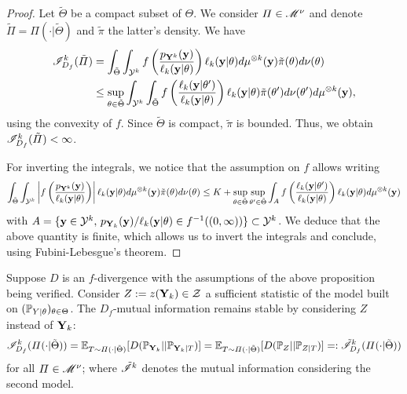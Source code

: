 \begin{proof}
    Let $\tilde\Theta$ be a compact subset of $\Theta$. We consider $\varPi\in\mathscr{M}^\nu$ and denote $\tilde\varPi=\varPi(\cdot|\tilde\Theta)$ and  $\tilde\pi$ the latter's density. We have
        \begin{equation}
        \begin{aligned}
            \mathscr{I}^k_{D_f}(\tilde\varPi) &= \int_{\tilde\Theta}\int_{\mathcal{Y}^k} f\left( \frac{p_{\mathbf{Y}^k}(\mathbf{y})}{\ell_k(\mathbf{y}|\theta)}\right)\ell_k(\mathbf{y}|\theta) d\mu^{\otimes k}(\mathbf{y}) \tilde\pi(\theta)d\nu(\theta) \\
                &\leq \sup_{\theta\in\tilde\Theta}\int_{\mathcal{Y}^k} \int_{\tilde\Theta} f\left( \frac{\ell_k(\mathbf{y}|\theta')}{\ell_k(\mathbf{y}|\theta)}\right)\ell_k(\mathbf{y}|\theta) \tilde\pi(\theta')d\nu(\theta') d\mu^{\otimes k}(\mathbf{y}) ,
        \end{aligned}
        \end{equation}
        using the convexity of $f$. Since $\tilde\Theta$ is compact, $\tilde\pi$ is bounded. Thus, we obtain $\mathscr{I}^k_{D_f}(\tilde\varPi)<\infty$.

        For inverting the integrals, we notice that the assumption on $f$ allows writing 
        \begin{equation}
            \int_{\tilde\Theta}\int_{\mathcal{Y}^k} \left|f\left( \frac{p_{\mathbf{Y}^k}(\mathbf{y})}{\ell_k(\mathbf{y}|\theta)}\right)\right|\ell_k(\mathbf{y}|\theta) d\mu^{\otimes k}(\mathbf{y}) \tilde\pi(\theta)d\nu(\theta) \leq K + \sup_{\theta\in\tilde\Theta}\sup_{\theta'\in\tilde\Theta} \int_{A} f\left(\frac{\ell_k(\mathbf{y}|\theta')}{\ell_k(\mathbf{y}|\theta)}  \right) \ell_k(\mathbf{y}|\theta) d\mu^{\otimes k}(\mathbf{y})
        \end{equation}
        with $A=\{\mathbf{y}\in\mathcal{Y}^k,\, p_{\mathbf{Y}_k}(\mathbf{y})/\ell_k(\mathbf{y}|\theta)\in f^{-1}((0,\infty)) \}\subset\mathcal{Y}^k $. We deduce that the above quantity is finite, which allows us to invert the integrals and conclude, using Fubini-Lebesgue's theorem.
\end{proof}

\begin{prop}
    Suppose $D$ is an $f$-divergence with the assumptions of the above proposition being verified.
    Consider $Z:=z(\mathbf{Y}_k)\in\mathcal{Z}$ a sufficient statistic of the model built on $(\mathbb{P}_{Y|\theta})_{\theta\in\Theta}$. %
    The $D_f$-mutual information remains stable by considering $Z$ instead of $\mathbf{Y}_k$:
    \begin{equation}
        \mathscr{I}^k_{D_f}(\varPi(\cdot|\tilde\Theta)) = \mathbb{E}_{T\sim\varPi(\cdot|\tilde\Theta)}[D(\mathbb{P}_{\mathbf{Y}_k}||\mathbb{P}_{\mathbf{Y}_k|T} )] = \mathbb{E}_{T\sim\varPi(\cdot|\tilde\Theta)}[D(\mathbb{P}_{Z}||\mathbb{P}_{Z|T} )] =: \tilde{\mathscr{I}}_{D_f}^k(\varPi(\cdot|\tilde\Theta))
    \end{equation}
    for all $\varPi\in\mathscr{M}^\nu$; where $\tilde{\mathscr{I}}^k$ denotes the mutual information considering the second model.
\end{prop}

